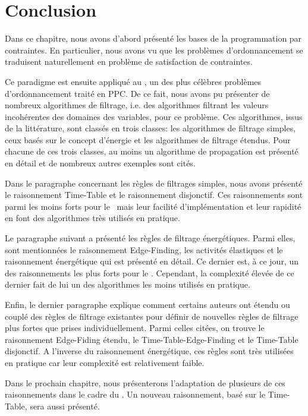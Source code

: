 \section*{Conclusion}

Dans ce chapitre, nous avons d'abord présenté les bases de la
programmation par contraintes. En particulier, nous avons vu que les
problèmes d'ordonnancement se traduisent naturellement en problème de
satisfaction de contraintes. 

Ce paradigme est ensuite appliqué au \CUSP, un des plus célèbres
problèmes d'ordonnancement traité en PPC. De ce fait, nous avons pu
présenter de nombreux algorithmes de filtrage, i.e. des algorithmes
filtrant les valeurs incohérentes des domaines des variables, pour ce
problème. Ces algorithmes, issus de la littérature, sont classés en
trois classes: les algorithmes de filtrage simples, ceux basés sur le
concept d'énergie et les algorithmes de filtrage étendus. Pour chacune
de ces trois classes, au moins un algorithme de propagation est
présenté en détail et de nombreux autres exemples sont cités.

Dans le paragraphe concernant les règles de filtrages simples, nous
avons présenté le raisonnement Time-Table et le raisonnement
disjonctif. Ces raisonnements sont parmi les moins forts pour le
\CUSP~mais leur facilité d'implémentation et leur rapidité en font des
algorithmes très utilisés en pratique. 

Le paragraphe suivant a présenté les règles de filtrage 
énergétiques. Parmi elles, sont mentionnées le raisonnement
Edge-Finding, les activités élastiques et le raisonnement énergétique
qui est présenté en détail. Ce dernier est, à ce jour, un des
raisonnements les plus forts pour le \CUSP. Cependant, la complexité
élevée de ce dernier fait de lui un des algorithmes les moins utilisés 
en pratique.

Enfin, le dernier paragraphe explique comment certains auteurs ont
étendu ou couplé des règles de filtrage existantes pour définir de
nouvelles règles de filtrage plus fortes que prises
individuellement. Parmi celles citées, on trouve le raisonnement
Edge-Fiding étendu, le Time-Table-Edge-Finding et le Time-Table
disjonctif. A l'inverse du raisonnement énergétique, ces règles
sont très utilisées en pratique car leur complexité est relativement
faible. 

Dans le prochain chapitre, nous présenterons l'adaptation de plusieurs
de ces raisonnements dans le cadre du \CECSP. Un nouveau raisonnement,
basé sur le Time-Table, sera aussi présenté.